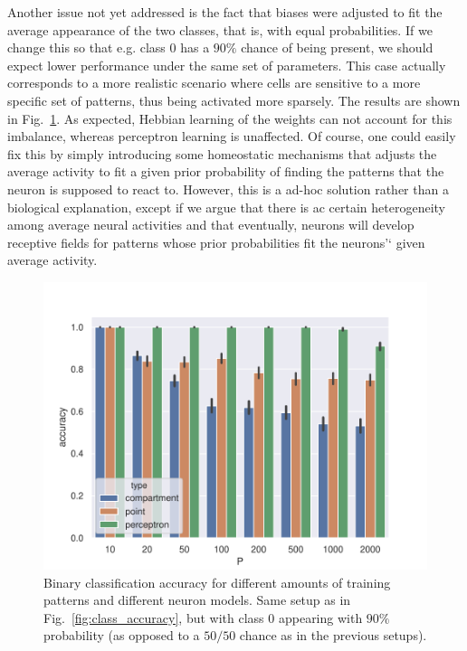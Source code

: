 \documentclass[10pt,a4paper]{article}
\begin{document}
Another issue not yet addressed is the fact that biases were adjusted to fit the average appearance of the two classes, that is, with equal probabilities. If we change this so that e.g. class $0$ has a $90\%$ chance of being present, we should expect lower performance under the same set of parameters. This case actually corresponds to a more realistic scenario where cells are sensitive to a more specific set of patterns, thus being activated more sparsely. The results are shown in Fig.~\ref{fig:class_accuracy_imbalance}. As expected, Hebbian learning of the weights can not account for this imbalance, whereas perceptron learning is unaffected. Of course, one could easily fix this by simply introducing some homeostatic mechanisms that adjusts the average activity to fit a given prior probability of finding the patterns that the neuron is supposed to react to. However, this is a ad-hoc solution rather than a biological explanation, except if we argue that there is ac certain heterogeneity among average neural activities and that eventually, neurons will develop receptive fields for patterns whose prior probabilities fit the neurons'` given average activity.

\begin{figure}
	\includegraphics[width=\textwidth]{./figures/accuracy_pattern_number_class_imbalance.pdf}
	\caption{Binary classification accuracy for different amounts of training patterns and different neuron models. Same setup as in Fig.~\ref{fig:class_accuracy}, but with class $0$ appearing with $90\%$ probability (as opposed to a $50/50$ chance as in the previous setups).}
	\label{fig:class_accuracy_imbalance}
\end{figure}
\end{document}
